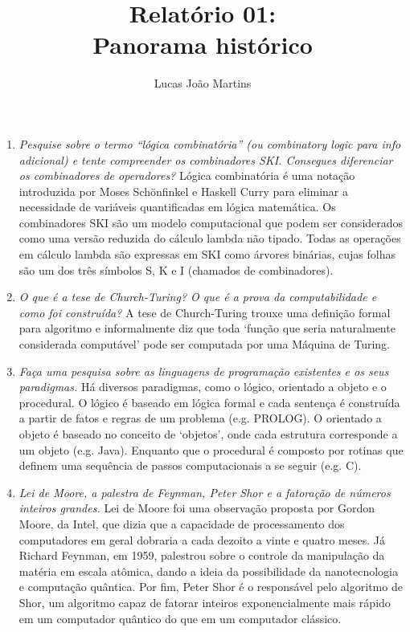 \documentclass[12pt]{article}
\title{Relatório 01: \\ Panorama histórico}
\author{Lucas João Martins}
\date{}
\begin{document}
\maketitle

\section*{}

\begin{enumerate}
\item \textit{Pesquise sobre o termo ``lógica combinatória'' (ou combinatory logic para info adicional) e tente compreender os combinadores SKI. Consegues
diferenciar os combinadores de operadores?} Lógica combinatória é uma notação introduzida por Moses Schönfinkel e Haskell Curry para eliminar a necessidade de variáveis quantificadas em lógica matemática. Os combinadores SKI são um modelo computacional que podem ser considerados como uma versão reduzida do cálculo lambda não tipado. Todas as operações em cálculo lambda são expressas em SKI como árvores binárias, cujas folhas são um dos três símbolos S, K e I (chamados de combinadores).

\item \textit{O que é a tese de Church-Turing? O que é a prova da computabilidade e como foi construída?} A tese de Church-Turing trouxe uma definição formal para algoritmo e informalmente diz que toda `função que seria naturalmente considerada computável' pode ser computada por uma Máquina de Turing.

\item \textit{Faça uma pesquisa sobre as linguagens de programação existentes e os seus paradigmas.} Há diversos paradigmas, como o lógico, orientado a objeto e o procedural. O lógico é baseado em lógica formal e cada sentença é construída a partir de fatos e regras de um problema (e.g. PROLOG). O orientado a objeto é baseado no conceito de `objetos', onde cada estrutura corresponde a um objeto (e.g. Java). Enquanto que o procedural é composto por rotinas que definem uma sequência de passos computacionais a se seguir (e.g. C).

\item \textit{Lei de Moore, a palestra de Feynman, Peter Shor e a fatoração de
números inteiros grandes.} Lei de Moore foi uma observação proposta por Gordon Moore, da Intel, que dizia que a capacidade de processamento dos computadores em geral dobraria a cada dezoito a vinte e quatro meses. Já Richard Feynman, em 1959, palestrou sobre o controle da manipulação da matéria em escala atômica, dando a ideia da possibilidade da nanotecnologia e computação quântica. Por fim, Peter Shor é o responsável pelo algoritmo de Shor, um algoritmo capaz de fatorar inteiros exponencialmente mais rápido em um computador quântico do que em um computador clássico.


\end{enumerate}
\end{document}
